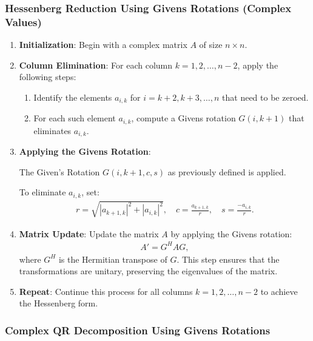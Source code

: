 \documentclass[12pt]{article}
\numberwithin{equation}{subsubsection}
\begin{document}
\subsubsection{Hessenberg Reduction Using Givens Rotations (Complex Values)}
\begin{enumerate}
	\item \textbf{Initialization}:
	      Begin with a complex matrix $ A $ of size $ n \times n $.
	      
	\item \textbf{Column Elimination}:
	      For each column $ k = 1, 2, \ldots, n-2 $, apply the following steps:
	      \begin{enumerate}
	      	\item Identify the elements $ a_{i,k} $ for $ i = k+2, k+3, \ldots, n $ that need to be zeroed.
	      	\item For each such element $ a_{i,k} $, compute a Givens rotation $ G(i, k+1) $ that eliminates $ a_{i,k} $.
	      \end{enumerate}
	      
	\item \textbf{Applying the Givens Rotation}:
	          
	      The Given's Rotation $G(i, k+1, c, s)$ as previously defined is applied.
	      
	      To eliminate $ a_{i,k} $, set:
	      \begin{align}
	      	r = \sqrt{|a_{k+1,k}|^2 + |a_{i,k}|^2}, \quad c = \frac{a_{k+1,k}}{r}, \quad s = \frac{-a_{i,k}}{r}.
	      \end{align}
	      
	\item \textbf{Matrix Update}:
	      Update the matrix $ A $ by applying the Givens rotation:
	      \begin{align}
	      	A' = G^H A G,
	      \end{align}
	      where $ G^H $ is the Hermitian transpose of $ G $. This step ensures that the transformations are unitary, preserving the eigenvalues of the matrix.
	      
	\item \textbf{Repeat}:
	      Continue this process for all columns $ k = 1, 2, \ldots, n-2 $ to achieve the Hessenberg form.
	      
\end{enumerate}

\subsubsection{Complex QR Decomposition Using Givens Rotations}
\end{document}
